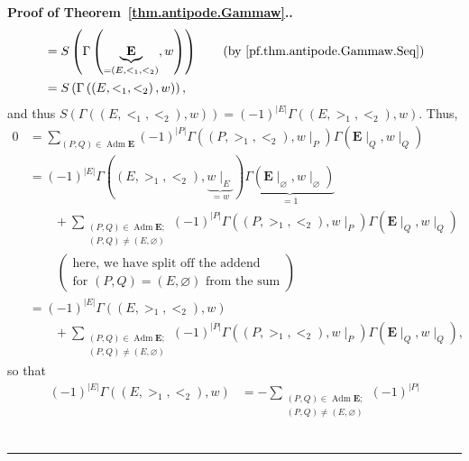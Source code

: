 \documentclass[numbers=enddot,12pt,final,onecolumn,notitlepage,abstracton]{scrartcl}
\theoremstyle{definition}
\newenvironment{proof}[1][Proof]{\noindent\textbf{#1.} }{\ \rule{0.5em}{0.5em}}
\let\sumnonlimits\sum
\renewcommand{\sum}{\sumnonlimits\limits}
\newenvironment{verlong}{}{}
\newenvironment{vershort}{}{}
\newcommand{\Adm}{\operatorname{Adm}}
\newcommand{\EE}{{\mathbf{E}}}
\begin{document}
\begin{proof}[Proof of Theorem~\ref{thm.antipode.Gammaw}.]
\begin{vershort}
\begin{align*}
&= S\left(\Gamma\left(\underbrace{\EE}_{=\left(E, <_1, <_2\right)}, w\right)\right)
\qquad \left(\text{by \eqref{pf.thm.antipode.Gammaw.Seq}}\right) \\
&= S\left(\Gamma\left(\left(E, <_1, <_2\right), w\right)\right) ,
\end{align*}
and thus
$S\left(\Gamma\left(\left(E, <_1, <_2\right), w\right) \right)
= \left(-1\right)^{\left|E\right|}
\Gamma\left(\left(E, >_1, <_2\right), w\right)$.
\end{vershort}
\begin{verlong}
Thus,
\begin{align*}
0 &= \sum_{\left(P, Q\right) \in \Adm \EE}
\left(-1\right)^{\left|P\right|}
\Gamma\left(\left(P, >_1, <_2\right), w\mid_P\right)
\Gamma\left(\EE\mid_Q, w\mid_Q\right) \\
&= \left(-1\right)^{\left|E\right|}
\Gamma\left(\left(E, >_1, <_2\right), \underbrace{w\mid_E}_{=w}\right)
\underbrace{\Gamma\left(\EE\mid_\varnothing, w\mid_\varnothing\right)
           }_{=1}
\\
& \qquad
 + \sum_{\substack{\left(P, Q\right) \in \Adm \EE ; \\
                   \left(P, Q\right) \neq \left(E, \varnothing\right)}}
\left(-1\right)^{\left|P\right|}
\Gamma\left(\left(P, >_1, <_2\right), w\mid_P\right)
\Gamma\left(\EE\mid_Q, w\mid_Q\right)
\\
& \ \ \ \ \ \ \ \ \ \ \left( \begin{array}{c}
  \text{here, we have split off the addend } \\
  \text{for } \left(P, Q\right) = \left(E, \varnothing\right)
  \text{ from the sum}
  \end{array} \right) \\
&= \left(-1\right)^{\left|E\right|} \Gamma\left(\left(E, >_1, <_2\right), w\right) \\
& \qquad
+ \sum_{\substack{\left(P, Q\right) \in \Adm \EE ; \\
                  \left(P, Q\right) \neq \left(E, \varnothing\right)}}
\left(-1\right)^{\left|P\right|}
\Gamma\left(\left(P, >_1, <_2\right), w\mid_P\right)
\Gamma\left(\EE\mid_Q, w\mid_Q\right) ,
\end{align*}
so that
\begin{align*}
\left(-1\right)^{\left|E\right|} \Gamma\left(\left(E, >_1, <_2\right), w\right)
&= - \sum_{\substack{\left(P, Q\right) \in \Adm \EE ; \\
                     \left(P, Q\right) \neq \left(E, \varnothing\right)}}
\left(-1\right)^{\left|P\right|}

\end{align*}
\end{verlong}
\end{proof}
\end{document}
